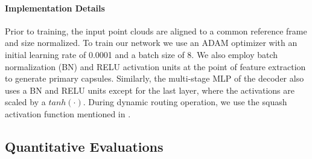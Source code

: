 \documentclass[10pt,twocolumn,letterpaper]{article}
\theoremstyle{break}
\begin{document}
\paragraph{Implementation Details}
Prior to training, the input point clouds are aligned to a common reference frame and size normalized. To train our network we use an ADAM optimizer with an initial learning rate of 0.0001 and a batch size of 8. We also employ batch normalization (BN) and RELU activation units at the point of feature extraction to generate primary capsules. Similarly, the multi-stage MLP of the decoder also uses a BN and RELU units except for the last layer, where the activations are scaled by a $tanh(\cdot)$. During dynamic routing operation, we use the squash activation function mentioned in \cite{sabour2017dynamic,hinton2011transforming}.








\begin{table}[t]
  \centering
  \caption{Evaluating reconstruction quality. Oracle refers to a random sampling of the input 3D shape and constitutes an lower bound on what is achievable. The Chamfer Distance is multiplied by $10^3$ for better viewing. CD denotes \textit{Chamfer distance} and PB refers to \textit{Point Baseline}.}
  \vspace{2pt}
    \vspace{-3mm}
\end{table} 
\subsection{Quantitative Evaluations}
\end{document}
